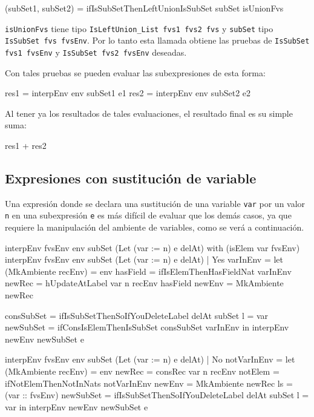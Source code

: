 \begin{code}
(subSet1, subSet2) = 
  ifIsSubSetThenLeftUnionIsSubSet subSet isUnionFvs
\end{code}

\texttt{isUnionFvs} tiene tipo \texttt{IsLeftUnion\_List fvs1 fvs2 fvs} y \texttt{subSet} tipo \texttt{IsSubSet fvs fvsEnv}. Por lo tanto esta llamada obtiene las pruebas de \texttt{IsSubSet fvs1 fvsEnv} y \texttt{IsSubSet fvs2 fvsEnv} deseadas.

Con tales pruebas se pueden evaluar las subexpresiones de esta forma:

\begin{code}
res1 = interpEnv env subSet1 e1
res2 = interpEnv env subSet2 e2
\end{code}

Al tener ya los resultados de tales evaluaciones, el resultado final es su simple suma:

\begin{code}
res1 + res2
\end{code}

\subsection{Expresiones con sustitución de variable}

Una expresión donde se declara una sustitución de una variable \texttt{var} por un valor \texttt{n} en una subexpresión \texttt{e} es más difícil de evaluar que los demás casos, ya que requiere la manipulación del ambiente de variables, como se verá a continuación.

\begin{code}
interpEnv {fvsEnv} env subSet (Let (var := n) e delAt) 
    with (isElem var fvsEnv)
  interpEnv {fvsEnv} env subSet (Let (var := n) e delAt) 
    | Yes varInEnv = 
    let
        (MkAmbiente recEnv) = env
        hasField = ifIsElemThenHasFieldNat varInEnv 
        newRec = hUpdateAtLabel var n recEnv hasField
        newEnv = MkAmbiente newRec
        
        consSubSet = 
          ifIsSubSetThenSoIfYouDeleteLabel delAt subSet {l = var}
        newSubSet = ifConsIsElemThenIsSubSet consSubSet varInEnv
    in interpEnv newEnv newSubSet e
    
  interpEnv {fvsEnv} env subSet (Let (var := n) e delAt) 
    | No notVarInEnv = 
    let (MkAmbiente recEnv) = env
        newRec = consRec var n recEnv
          {notElem = ifNotElemThenNotInNats notVarInEnv}
        newEnv = MkAmbiente newRec {ls = (var :: fvsEnv)}
        newSubSet = 
          ifIsSubSetThenSoIfYouDeleteLabel delAt subSet {l = var}
    in interpEnv newEnv newSubSet e
\end{code}

